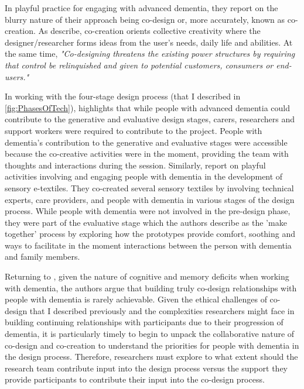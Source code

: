 In \cite{tsekleves2020engaging} playful practice for engaging with advanced dementia, they report on the blurry nature of their approach being co-design or, more accurately, known as co-creation. As \cite{sanders2008co} describe, co-creation orients collective creativity where the designer/researcher forms ideas from the user's needs, daily life and abilities. At the same time, \textit{"Co-designing threatens the existing power structures by requiring that control be relinquished and given to potential customers, consumers or end-users."}

In working with the four-stage design process (that I described in \ref{fig:PhasesOfTech}), \cite{tsekleves2020engaging} highlights that while people with advanced dementia could contribute to the generative and evaluative design stages, carers, researchers and support workers were required to contribute to the project. People with dementia's contribution to the generative and evaluative stages were accessible because the co-creative activities were in the moment, providing the team with thoughts and interactions during the session. Similarly, \cite{treadaway_sensor_2016} report on playful activities involving and engaging people with dementia in the development of sensory e-textiles. They co-created several sensory textiles by involving technical experts, care providers, and people with dementia in various stages of the design process. While people with dementia were not involved in the pre-design phase, they were part of the evaluative stage which the authors describe as the 'make together' process by exploring how the prototypes provide comfort, soothing and ways to facilitate in the moment interactions between the person with dementia and family members.

Returning to \cite{tsekleves2020engaging}, given the nature of cognitive and memory deficits when working with dementia, the authors argue that building truly co-design relationships with people with dementia is rarely achievable. Given the ethical challenges of co-design that I described previously and the complexities researchers might face in building continuing relationships with participants due to their progression of dementia, it is particularly timely to begin to unpack the collaborative nature of co-design and co-creation to understand the priorities for people with dementia in the design process. Therefore, researchers must explore to what extent should the research team contribute input into the design process versus the support they provide participants to contribute their input into the co-design process.


